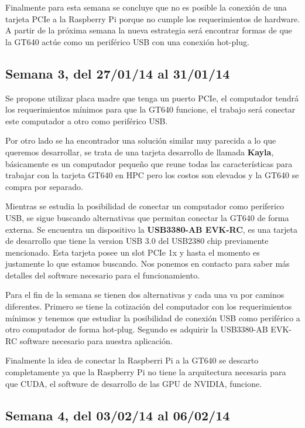 \documentclass[11pt,oneside,titlepage]{article}
\begin{document}
Finalmente para esta semana se concluye que no es posible la conexión de una tarjeta PCIe a la Raspberry Pi porque no cumple los requerimientos de hardware. A partir de la próxima semana la nueva estrategia será encontrar formas de que la GT640 actúe como un periférico USB con una conexión hot-plug.

\subsection*{Semana 3, del 27/01/14 al 31/01/14}

Se propone utilizar placa madre que tenga un puerto PCIe, el computador tendrá los requerimientos mínimos para que la GT640 funcione, el trabajo será conectar este computador a otro como periférico USB. 

Por otro lado se ha encontrador una solución similar muy parecida a lo que queremos desarrollar, se trata de una tarjeta desarrollo de llamada \textbf{Kayla}, básicamente es un computador pequeño que reune todas las características para trabajar con la tarjeta GT640 en HPC pero los costos son elevados y la GT640 se compra por separado.   

Mientras se estudia la posibilidad de conectar un computador como periferico USB, se sigue buscando alternativas que permitan conectar la GT640 de forma externa. Se encuentra un dispositivo la \textbf{USB3380-AB EVK-RC}, es una tarjeta de desarrollo que tiene la
version USB 3.0 del USB2380 chip previamente mencionado. Esta tarjeta posee un slot PCIe 1x y hasta el momento es justamente lo que estamos buscando. Nos ponemos en contacto para saber más detalles del software necesario para el funcionamiento.

Para el fin de la semana se tienen dos alternativas y cada una va por caminos diferentes. Primero se tiene la cotización del computador con los requerimientos mínimos y tenemos que estudiar la posibilidad de conexión USB como periférico a otro computador de forma hot-plug. Segundo es adquirir la USB3380-AB EVK-RC software necesario para nuestra aplicación.

Finalmente la idea de conectar la Raspberri Pi a la GT640 se descarto completamente ya que la Raspberry Pi no 
tiene la arquitectura necesaria para que CUDA, el software de desarrollo de las GPU de NVIDIA, funcione.

\subsection*{Semana 4, del 03/02/14 al 06/02/14}
\end{document}
